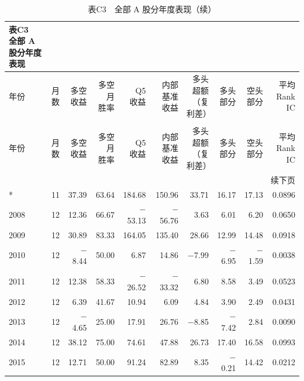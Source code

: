 \begingroup\small\setlength{\tabcolsep}{4pt}
\begin{longtable}{lrrrrrrrrr}
\caption*{\textbf{表C3　全部 A 股分年度表现}}\\
\toprule
年份 & 月数 & \makecell{多空\\收益} & \makecell{多空月\\胜率} & \makecell{Q5\\收益} & \makecell{内部基准\\收益} & \makecell{多头超额\\（复利差）} & \makecell{多头\\部分} & \makecell{空头\\部分} & \makecell{平均\\Rank IC} \\ \midrule
\endfirsthead
\caption*{表C3　全部 A 股分年度表现（续）}\\\toprule
年份 & 月数 & \makecell{多空\\收益} & \makecell{多空月\\胜率} & \makecell{Q5\\收益} & \makecell{内部基准\\收益} & \makecell{多头超额\\（复利差）} & \makecell{多头\\部分} & \makecell{空头\\部分} & \makecell{平均\\Rank IC} \\ \midrule
\endhead
\midrule\multicolumn{10}{r}{续下页}\\\endfoot
\bottomrule\endlastfoot
2007* & 11 & 37.39 & 63.64 & 184.68 & 150.96 & 33.71 & 16.17 & 17.13 & 0.0896 \\
2008 & 12 & 12.36 & 66.67 & $-$53.13 & $-$56.76 & 3.63 & 6.01 & 6.20 & 0.0650 \\
2009 & 12 & 30.89 & 83.33 & 164.05 & 135.40 & 28.66 & 12.99 & 14.48 & 0.0918 \\
2010 & 12 & $-$8.44 & 50.00 & 6.87 & 14.86 & $-$7.99 & $-$6.95 & $-$1.59 & 0.0038 \\
2011 & 12 & 12.38 & 58.33 & $-$26.52 & $-$33.32 & 6.80 & 8.58 & 3.49 & 0.0523 \\
2012 & 12 & 6.39 & 41.67 & 10.94 & 6.09 & 4.84 & 3.90 & 2.49 & 0.0431 \\
2013 & 12 & $-$4.65 & 25.00 & 17.91 & 26.76 & $-$8.85 & $-$7.42 & 2.84 & 0.0090 \\
2014 & 12 & 38.12 & 75.00 & 74.61 & 47.88 & 26.73 & 17.40 & 16.58 & 0.0993 \\
2015 & 12 & 12.71 & 50.00 & 91.24 & 82.89 & 8.35 & $-$0.21 & 14.42 & 0.0212 \\

\end{longtable}
